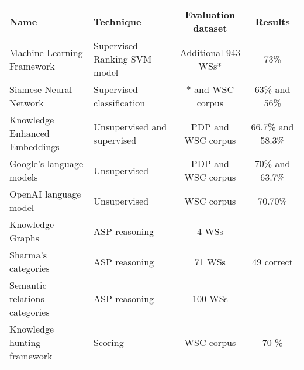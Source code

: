 

\begin{tabular}{ | l | l | c | c | }
    \hline
    \textbf{Name}  & \textbf{Technique}  & \textbf{Evaluation dataset } &\textbf{Results}\\ \hline
    Machine Learning Framework &Supervised Ranking SVM model & Additional 943 WSs* & 73\% \\\hline
    Siamese Neural Network & Supervised classification & * and WSC corpus & 63\% and 56\% \\\hline
    Knowledge Enhanced Embeddings & Unsupervised and supervised & PDP and WSC corpus  & 66.7\% and 58.3\% \\\hline
    Google's language models & Unsupervised & PDP and WSC corpus & 70\% and 63.7\% \\\hline
    OpenAI language model & Unsupervised & WSC corpus & 70.70\% \\\hline
    Knowledge Graphs & ASP reasoning & 4 WSs & \\\hline
    Sharma's categories & ASP reasoning & 71 WSs & 49 correct \\\hline
    Semantic relations categories & ASP reasoning & 100 WSs& \\\hline
    Knowledge hunting framework &Scoring & WSC corpus & 70 \% \\\hline
\end{tabular}